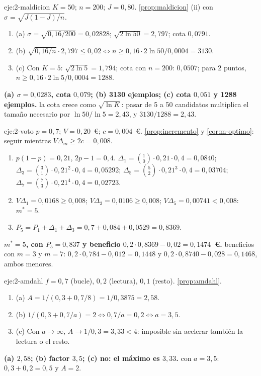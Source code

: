 \begin{solucion}{eje:2-maldicion}
\datos $K=50$; $n=200$; $J=0{,}80$.
\planteamiento \cref{prop:maldicion} (ii) con $\sigma=\sqrt{J(1-J)/n}$.
\pasos
\begin{enumerate}[label=\arabic*.]
  \item (a) $\sigma=\sqrt{0{,}16/200}=0{,}02828$; $\sqrt{2\ln50}=2{,}797$; cota $0{,}0791$.
  \item (b) $\sqrt{0{,}16/n}\cdot2{,}797\le0{,}02\iff n\ge0{,}16\cdot2\ln50/0{,}0004=3130$.
  \item (c) Con $K=5$: $\sqrt{2\ln5}=1{,}794$; cota con $n=200$: $0{,}0507$; para 2 puntos, $n\ge0{,}16\cdot2\ln5/0{,}0004=1288$.
\end{enumerate}
\resultado \textbf{(a) $\sigma=0{,}0283$, cota $0{,}079$; (b) 3130 ejemplos; (c) cota $0{,}051$ y 1288 ejemplos.}
\comprobacion la cota crece como $\sqrt{\ln K}$: pasar de 5 a 50 candidatos multiplica el tamaño necesario por $\ln50/\ln5=2{,}43$, y $3130/1288=2{,}43$.
\end{solucion}

\begin{solucion}{eje:2-voto}
\datos $p=0{,}7$; $V=0{,}20$~€; $c=0{,}004$~€.
\planteamiento \cref{prop:incremento} y \cref{cor:m-optimo}: seguir mientras $V\Delta_m\ge2c=0{,}008$.
\pasos
\begin{enumerate}[label=\arabic*.]
  \item $p(1-p)=0{,}21$, $2p-1=0{,}4$. $\Delta_1=\binom10\cdot0{,}21\cdot0{,}4=0{,}0840$; $\Delta_3=\binom31\cdot0{,}21^{2}\cdot0{,}4=0{,}05292$; $\Delta_5=\binom52\cdot0{,}21^{3}\cdot0{,}4=0{,}03704$; $\Delta_7=\binom73\cdot0{,}21^{4}\cdot0{,}4=0{,}02723$.
  \item $V\Delta_1=0{,}0168\ge0{,}008$; $V\Delta_3=0{,}0106\ge0{,}008$; $V\Delta_5=0{,}00741<0{,}008$: $m^{*}=5$.
  \item $P_5=P_1+\Delta_1+\Delta_3=0{,}7+0{,}084+0{,}0529=0{,}8369$.
\end{enumerate}
\resultado \textbf{$m^{*}=5$, con $P_5=0{,}837$ y beneficio $0{,}2\cdot0{,}8369-0{,}02=0{,}1474$~€.}
\comprobacion beneficios con $m=3$ y $m=7$: $0{,}2\cdot0{,}784-0{,}012=0{,}1448$ y $0{,}2\cdot0{,}8740-0{,}028=0{,}1468$, ambos menores.
\end{solucion}

\begin{solucion}{eje:2-amdahl}
\datos $f=0{,}7$ (bucle), $0{,}2$ (lectura), $0{,}1$ (resto).
\planteamiento \cref{prop:amdahl}.
\pasos
\begin{enumerate}[label=\arabic*.]
  \item (a) $A=1/(0{,}3+0{,}7/8)=1/0{,}3875=2{,}58$.
  \item (b) $1/(0{,}3+0{,}7/a)=2\iff0{,}7/a=0{,}2\iff a=3{,}5$.
  \item (c) Con $a\to\infty$, $A\to1/0{,}3=3{,}33<4$: imposible sin acelerar también la lectura o el resto.
\end{enumerate}
\resultado \textbf{(a) $2{,}58$; (b) factor $3{,}5$; (c) no: el máximo es $3{,}33$.}
\comprobacion con $a=3{,}5$: $0{,}3+0{,}2=0{,}5$ y $A=2$.
\end{solucion}

